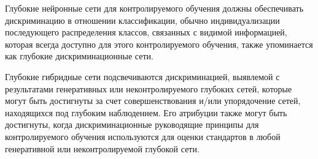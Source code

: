 \begin{frame}

    Глубокие нейронные сети для контролируемого обучения должны обеспечивать дискриминацию в отношении классификации,
    обычно индивидуализации последующего распределения классов, связанных с видимой информацией,
    которая всегда доступно для этого контролируемого обучения, также упоминается как глубокие дискриминационные сети.

    Глубокие гибридные сети подсвечиваются дискриминацией, выявлемой с результатами генеративных или неконтролируемого глубоких сетей, которые могут быть достигнуты за счет
    совершенствования и/или упорядочение сетей, находящихся под глубоким наблюдением. Его атрибуции также могут быть достигнуты,
    когда дискриминационные руководящие принципы для контролируемого обучения используются для оценки стандартов в любой генеративной или неконтролируемой глубокой сети.

\end{frame}